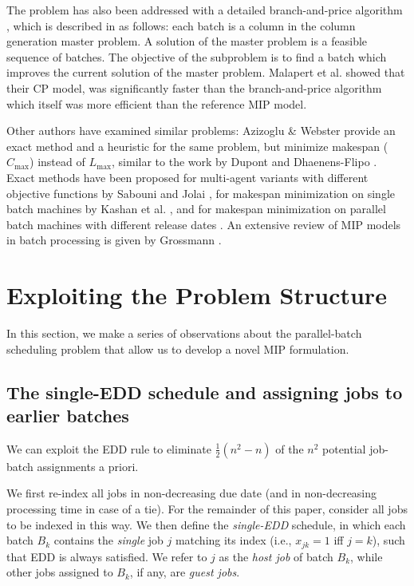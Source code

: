 \documentclass[oribibl]{llncs}
\def\Lmax{{L_{\mathrm{max}}}}
\begin{document}
The problem has also been addressed with a detailed branch-and-price
algorithm \cite{Daste1}, which is described in \cite{Malapert} as
follows: each batch is a column in the column generation master
problem. A solution of the master problem is a feasible sequence of
batches. The objective of the subproblem is to find a batch which
improves the current solution of the master problem. Malapert et al.
\cite{Malapert} showed that their CP model, was significantly faster
than the branch-and-price algorithm which itself was more efficient 
than the reference MIP model. 

Other authors have examined similar problems: Azizoglu \& Webster
\cite{Azizoglu} provide an exact method and a heuristic for the same
problem, but minimize makespan ($C_\mathrm{max}$) instead of $\Lmax$,
similar to the work by Dupont and Dhaenens-Flipo \cite{Dupont}.
Exact methods have been proposed for multi-agent variants
with different objective functions by Sabouni and Jolai \cite{Sabouni},
for makespan minimization on single batch machines by Kashan et al.
\cite{Kashan}, and for makespan minimization on parallel batch machines
with different release dates \cite{Ozturk}. An
extensive review of MIP models in batch processing is given
by Grossmann \cite{Grossmann}. 

\section{Exploiting the Problem Structure}
\label{sec:propositions}

In this section, we make a series of observations about the
parallel-batch scheduling problem that allow us to develop a novel MIP
formulation.

\subsection{The single-EDD schedule and assigning jobs to earlier batches}
We can exploit the EDD rule to eliminate $\frac{1}{2}(n^2 - n)$ of the
$n^2$ potential job-batch assignments a priori.

We first re-index all jobs in non-decreasing due date (and in
non-decreasing processing time in case of a tie).
For the remainder of this paper, consider
all jobs to be indexed in this way. We then define
the \textit{single-EDD} schedule, in which each batch $B_k$ contains the
\textit{single} job $j$ matching its index (i.e., $x_{jk}=1$ iff
$j=k$), such that EDD is always satisfied. We refer to $j$ as the \textit{host
job} of batch $B_k$, while other jobs assigned to $B_k$, if any, are \textit{guest jobs}.
\end{document}
